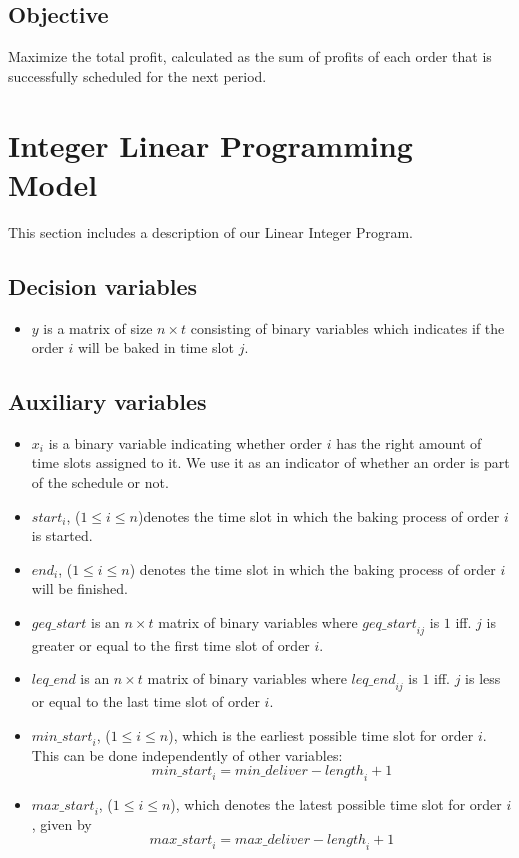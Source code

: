 \documentclass{article}
\begin{document}
\subsection*{Objective}
Maximize the total profit, calculated as the sum of profits of each order that is successfully scheduled for the next period.

\newpage
\section{Integer Linear Programming Model}
This section includes a description of our Linear Integer Program.
\subsection{Decision variables}
\begin{itemize}
    \item $y$ is a matrix of size $n \times t$ consisting of binary variables which indicates if the order $i$ will be baked in time slot $j$.
\end{itemize}

\subsection{Auxiliary variables}

\begin{itemize}
\item $x_i$ is a binary variable indicating whether order $i$ has the right amount of time slots assigned to it. 
We use it as an indicator of whether an order is part of the schedule or not.
\item $\mathit{start}_{i}$, ($1\leq i \leq n$)denotes the time slot in which the baking process of order $i$ is started.
\item $\mathit{end}_{i}$, ($1\leq i \leq n$) denotes the time slot in which the baking process of order $i$ will be finished.
\item $\mathit{geq\_start}$ is an $n \times t$ matrix of binary variables where $\mathit{geq\_start}_{ij}$ is $1$ iff. $j$ is greater or equal to the first time slot of order $i$.
\item $\mathit{leq\_end}$ is an $n \times t$ matrix of binary variables where $\mathit{leq\_end}_{ij}$ is $1$ iff. $j$ is less or equal to the last time slot of order $i$.
\item $\mathit{min\_start}_i$, ($1\leq i \leq n$), which is the earliest possible time slot for order $i$.
    This can be done independently of other variables: 
    $$\mathit{min\_start}_i = \mathit{min\_deliver} - \mathit{length}_i + 1$$
\item $\mathit{max\_start}_i$, ($1\leq i \leq n$), which denotes the latest possible time slot for order $i$, given by
    $$\mathit{max\_start}_i=\mathit{max\_deliver} - \mathit{length}_i + 1 $$
\end{itemize}
\end{document}
